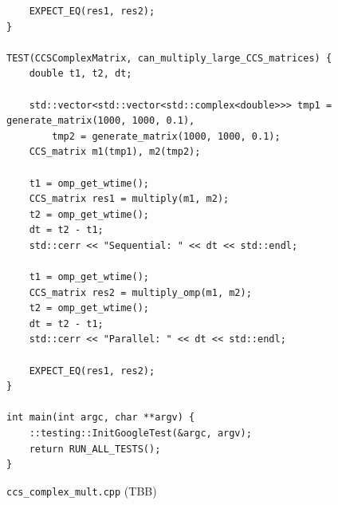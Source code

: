 \documentclass{report}
\begin{document}
\begin{lstlisting}
    EXPECT_EQ(res1, res2);
}

TEST(CCSComplexMatrix, can_multiply_large_CCS_matrices) {
    double t1, t2, dt;

    std::vector<std::vector<std::complex<double>>> tmp1 = generate_matrix(1000, 1000, 0.1),
        tmp2 = generate_matrix(1000, 1000, 0.1);
    CCS_matrix m1(tmp1), m2(tmp2);

    t1 = omp_get_wtime();
    CCS_matrix res1 = multiply(m1, m2);
    t2 = omp_get_wtime();
    dt = t2 - t1;
    std::cerr << "Sequential: " << dt << std::endl;

    t1 = omp_get_wtime();
    CCS_matrix res2 = multiply_omp(m1, m2);
    t2 = omp_get_wtime();
    dt = t2 - t1;
    std::cerr << "Parallel: " << dt << std::endl;

    EXPECT_EQ(res1, res2);
}

int main(int argc, char **argv) {
    ::testing::InitGoogleTest(&argc, argv);
    return RUN_ALL_TESTS();
}
\end{lstlisting}
\verb|ccs_complex_mult.cpp| (TBB)
\end{document}
